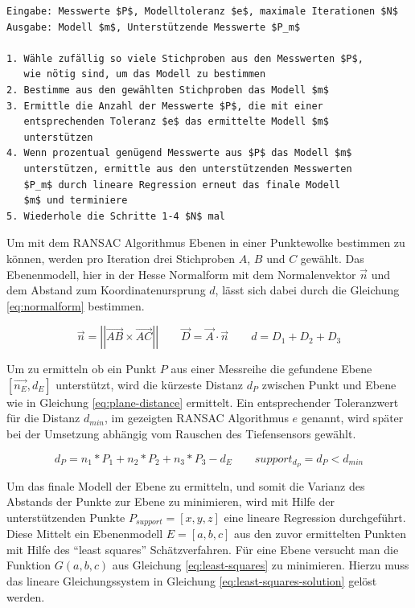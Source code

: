 \begin{lstlisting}[mathescape,caption=Der RANSAC Algorithmus, label=lst:ransac]
Eingabe: Messwerte $P$, Modelltoleranz $e$, maximale Iterationen $N$
Ausgabe: Modell $m$, Unterstützende Messwerte $P_m$

1. Wähle zufällig so viele Stichproben aus den Messwerten $P$,
   wie nötig sind, um das Modell zu bestimmen
2. Bestimme aus den gewählten Stichproben das Modell $m$
3. Ermittle die Anzahl der Messwerte $P$, die mit einer 
   entsprechenden Toleranz $e$ das ermittelte Modell $m$ 
   unterstützen
4. Wenn prozentual genügend Messwerte aus $P$ das Modell $m$ 
   unterstützen, ermittle aus den unterstützenden Messwerten 
   $P_m$ durch lineare Regression erneut das finale Modell 
   $m$ und terminiere
5. Wiederhole die Schritte 1-4 $N$ mal
\end{lstlisting} 

Um mit dem RANSAC Algorithmus Ebenen in einer Punktewolke bestimmen zu können, werden pro Iteration drei Stichproben \(A\), \(B\) und \(C\) gewählt. Das Ebenenmodell, hier in der Hesse Normalform mit dem Normalenvektor \(\vec{n}\) und dem Abstand zum Koordinatenursprung \(d\), lässt sich dabei durch die Gleichung \ref{eq:normalform} bestimmen.

\begin{equation}\label{eq:normalform}
\vec{n} =\left|\left| \vec{AB} \times \vec{AC}\right|\right|
\qquad
\vec{D} = \vec{A} \cdot \vec{n}
\qquad
d = D_1 + D_2 + D_3
\end{equation}

Um zu ermitteln ob ein Punkt \(P\) aus einer Messreihe die gefundene Ebene \(\left[\vec{n_E}, d_E\right]\) unterstützt, wird die kürzeste Distanz \(d_P\) zwischen Punkt und Ebene wie in Gleichung \ref{eq:plane-distance} ermittelt.  Ein entsprechender Toleranzwert für die Distanz \(d_{min}\), im gezeigten RANSAC Algorithmus \(e\) genannt, wird später bei der Umsetzung abhängig vom Rauschen des Tiefensensors gewählt. 

\begin{equation} \label{eq:plane-distance}
d_P = n_1*P_1+n_2*P_2+n_3*P_3-d_E \qquad support_{d_P} = d_P < d_{min}
\end{equation}

Um das finale Modell der Ebene zu ermitteln, und somit die Varianz des Abstands der Punkte zur Ebene zu minimieren, wird mit Hilfe der unterstützenden Punkte \(P_{support}=\left[x,y,z\right]\) eine lineare Regression durchgeführt. Diese Mittelt ein Ebenenmodell \(E=\left[a,b,c\right]\) aus den zuvor ermittelten Punkten mit Hilfe des \enquote{least squares} Schätzverfahren. Für eine Ebene versucht man die Funktion \(G(a,b,c)\) aus Gleichung \ref{eq:least-squares} zu minimieren. Hierzu muss das lineare Gleichungssystem in Gleichung \ref{eq:least-squares-solution}  gelöst werden. \citep{Regre94:online}

